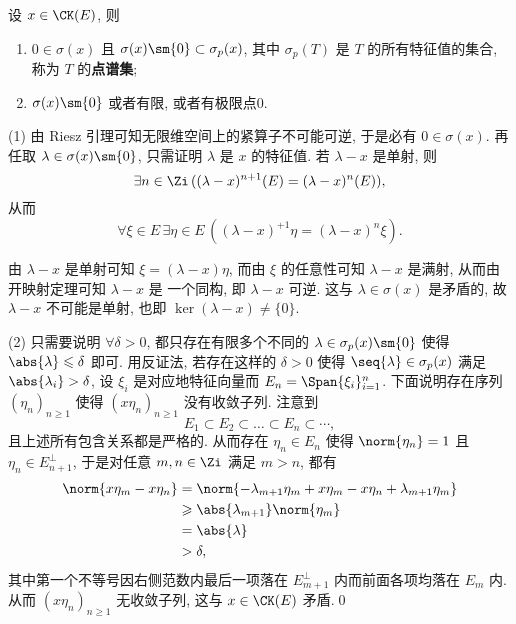 	\begin{Theorem}[紧算子的谱性质]\label{thm:紧算子的谱性质}
		设 $ x\in\CK(E) $, 则
		\begin{enumerate}[(1)]
			\item $ 0\in\sigma(x) $ 且 $ \sigma(x)\sm\{0\}\subset\sigma_p(x) $, 其中 $ \sigma_{p}(T) $ 是 $ T $ 的所有特征值的集合, 称为 $ T $ 的\textbf{点谱集};
			\item $ \sigma(x)\sm\{0\} $ 或者有限, 或者有极限点0.
		\end{enumerate}
	\end{Theorem}
	\begin{Proof}
		(1) 由 Riesz 引理可知无限维空间上的紧算子不可能可逆, 于是必有 $ 0\in\sigma(x) $. 再任取 $ \lambda\in\sigma(x)\sm\{0\} $, 只需证明 $ 	\lambda $ 是 $ x $ 的特征值. 若 $ \lambda-x $ 是单射, 则
		\[
			\exists n\in\Zi\,((\lambda-x)^{n+1}(E)=(\lambda-x)^n(E)),
		\]
		从而
		\[
			\forall\xi\in E\,\exists\eta\in E\,((\lambda-x)^{+1}\eta=(\lambda-x)^n\xi).
		\]

		由 $ \lambda-x $ 是单射可知 $ \xi=(\lambda-x)\eta $, 而由 $ \xi $ 的任意性可知 $ \lambda-x $ 是满射, 从而由开映射定理可知 $ \lambda-x $ 是	一个同构, 即 $ \lambda-x $ 可逆. 这与 $ \lambda\in\sigma(x) $ 是矛盾的, 故 $ \lambda-x $ 不可能是单射, 也即 $ \ker(\lambda-x)\ne\{0\} $.

		(2) 只需要说明 $ \forall\delta>0 $, 都只存在有限多个不同的 $ \lambda\in\sigma_p(x)\sm\{0\} $ 使得 $ \abs{\lambda}\leqslant\delta $ 即可. 用反证法, 若存在这样的 $ \delta>0 $ 使得 $ \seq{\lambda}\in\sigma_p(x) $ 满足 $ \abs{\lambda_i}>\delta $, 设 $ \xi_i $ 是对应地特征向量而 	$ E_n=\Span\{\xi_i\}_{i=1}^n $. 下面说明存在序列 $ (\eta_n)_{n\geqslant 1} $ 使得 $ (x\eta_n)_{n\geqslant 1} $ 没有收敛子列. 注意到
		\[
			E_1\subset E_2\subset\dots\subset E_n\subset\cdots,
		\]
		且上述所有包含关系都是严格的. 从而存在 $ \eta_n\in E_n $ 使得 $ \norm{\eta_n}=1 $ 且 $ \eta_n\in E_{n+1}^\bot $, 于是对任意 $ m,n\in\Zi $ 满足 $ m>n $, 都有
		\[
			\begin{aligned}
				\norm{x\eta_m-x\eta_n}&=\norm{-\lambda_{m+1}\eta_m+x\eta_m-x\eta_n+\lambda_{m+1}\eta_m}\\
				&\geqslant\abs{\lambda_{m+1}}\norm{\eta_m}\\
				&=\abs{\lambda}\\
				&>\delta,
			\end{aligned}
		\]
		其中第一个不等号因右侧范数内最后一项落在 $ E_{m+1}^\bot $ 内而前面各项均落在 $ E_m $ 内. 从而 $ (x\eta_n)_{n\geqslant 1} $ 无收敛子列, 这与 $ x\in\CK(E) $ 矛盾.\qed
	\end{Proof}
	
